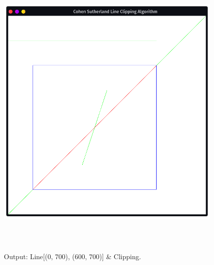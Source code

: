 \documentclass[12pt, a4]{article}
\begin{document}
\subsection*{}
\begin{figure}[h]
\centering
\caption{Output: Line[(0, 700), (600, 700)] \& Clipping.}
\includegraphics[height=15cm, width=15cm]{Outputs/Output-4.png}
\end{figure}

\newpage
\end{document}
